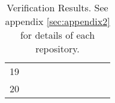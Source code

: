 \begin{table}[ht]
\begin{tabular}{c|lllllllll}
    19                                                                                                         &                                                                              &                                                          &                                                           &                                                                &                                                                  &                                                                                                                 &                                                                                                                &                                                                                                                                &                                                            \\
    20                                                                                                         &                                                                              &                                                          &                                                           &                                                                &                                                                  &                                                                                                                 &                                                                                                                &                                                                                                                                &
    \end{tabular}
    \caption{Verification Results. See appendix \ref{sec:appendix2} for details
    of each repository.}
    \label{tab:verification_results}
\end{table}